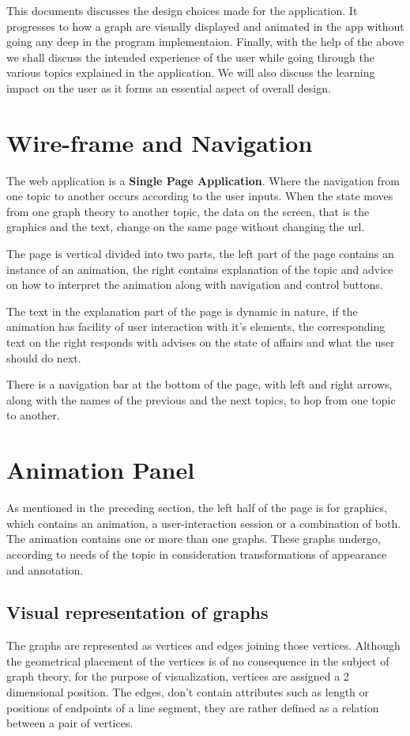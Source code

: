 
This documents discusses the design choices made for the application.  It
progresses to how a graph are visually displayed and animated in the app
without going any deep in the program implementaion.  Finally, with the help of
the above we shall discuss the intended experience of the user while going
through the various topics explained in the application. We will also discuss
the learning impact on the user as it forms an essential aspect of overall
design.


\section{Wire-frame and Navigation}

The web application is a \textbf{Single Page Application}. Where the navigation
from one topic to another occurs according to the user inputs. When the state
moves from one graph theory to another topic, the data on the screen, that is
the graphics and the text, change on the same page without changing the url.

The page is vertical divided into two parts, the left part of the page contains
an instance of an animation, the right contains explanation of the topic and
advice on how to interpret the animation along with navigation and control
buttons. 

The text in the explanation part of the page is dynamic in nature, if the
animation has facility of user interaction with it's elements, the
corresponding text on the right responds with advises on the state of affairs
and what the user should do next.

There is a navigation bar at the bottom of the page, with left and right
arrows, along with the names of the previous and the next topics, to hop from
one topic to another.


\section{Animation Panel} 
As mentioned in the preceding section, the left half of the page is for
graphics, which contains an animation, a user-interaction session or a
combination of both.  The animation contains one or more than one graphs. These
graphs undergo, according to needs of the topic in consideration
transformations of appearance and annotation.

\subsection{Visual representation of graphs} 
The graphs are represented as vertices and edges joining those vertices.
Although the geometrical placement of the vertices is of no consequence in the
subject of graph theory, for the purpose of visualization, vertices are
assigned a 2 dimensional position. The edges, don't contain attributes such as
length or positions of endpoints of a line segment, they are rather defined as
a relation between a pair of vertices.

